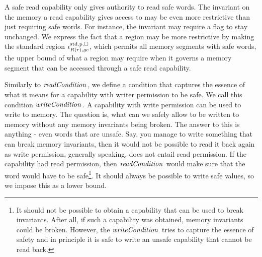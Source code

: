 \begin{jversion}
A safe read capability only gives authority to read safe words.
The invariant on the memory a read capability gives access to may be even more restrictive than just requiring safe words.
For instance, the invariant may require a flag to stay unchanged.
We express the fact that a region may be more restrictive by making the standard region $\iota^{\mathrm{std},\mathrm{p},\square}_{R(r),\mathit{gc}}$, which permits all memory segments with safe words, the upper bound of what a region may require when it governs a memory segment that can be accessed through a safe read capability.


Similarly to $\readCond[]{}$, we define a condition that captures the essence of what it means for a capability with writer permission to be safe.
We call this condition $\writeCond[]{}$.
A capability with write permission can be used to write to memory.
The question is, what can we safely allow to be written to memory without any memory invariants being broken.
The answer to this is anything - even words that are unsafe.
Say, you manage to write something that can break memory invariants, then it would not be possible to read it back again as write permission, generally speaking, does not entail read permission.
If the capability had read permission, then $\readCond[]{}$ would make sure that the word would have to be safe\footnote{It should not be possible to obtain a capability that can be used to break invariants. After all, if such a capability was obtained, memory invariants could be broken.
  However, the $\writeCond[]{}$ tries to capture the essence of safety and in principle it is safe to write an unsafe capability that cannot be read back.}.
It should always be possible to write safe values, so we impose this as a lower bound.


\end{jversion}
